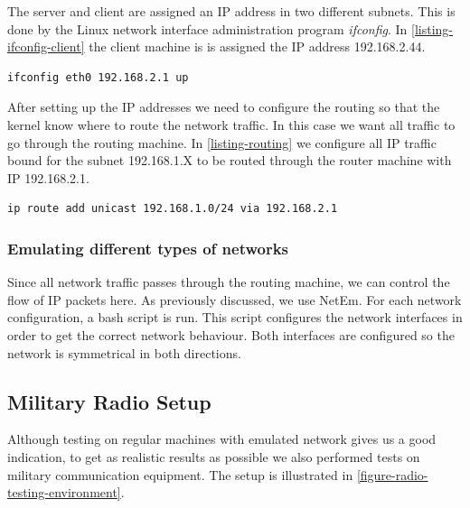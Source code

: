The server and client are assigned an IP address in two different subnets.
This is done by the Linux network interface administration program
\textit{ifconfig}. In \cref{listing-ifconfig-client} the client machine is is
assigned the IP address 192.168.2.44.

\begin{lstlisting}[frame=single, caption="Configuring a network interface of the router", label=listing-ifconfig-client]
ifconfig eth0 192.168.2.1 up
\end{lstlisting}

After setting up the IP addresses we need to configure the routing so that the
kernel know where to route the network traffic. In this case we want all
traffic to go through the routing machine. In \cref{listing-routing} we
configure all IP traffic bound for the subnet 192.168.1.X to be routed through
the router machine with IP 192.168.2.1.

\begin{lstlisting}[frame=single, caption="Configuring routing rules for the client", label=listing-routing]
ip route add unicast 192.168.1.0/24 via 192.168.2.1
\end{lstlisting}

\subsubsection{Emulating different types of networks}

Since all network traffic passes through the routing machine, we can control
the flow of IP packets here. As previously discussed, we use NetEm.  For each
network configuration, a bash script is run. This script configures the
network interfaces in order to get the correct network behaviour. Both
interfaces are configured so the network is symmetrical in both directions.

\subsection{Military Radio Setup}

Although testing on regular machines with emulated network gives us a good
indication, to get as realistic results as possible we also performed tests on
military communication equipment. The setup is illustrated in
\cref{figure-radio-testing-environment}.

